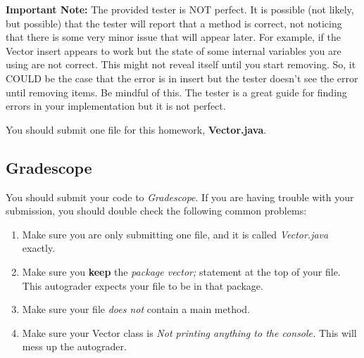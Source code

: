 \documentclass[paper=a4, fontsize=11pt, parskip=full]{scrartcl} %
\numberwithin{equation}{section} %
\numberwithin{figure}{section} %
\numberwithin{table}{section} %
\begin{document}
\textbf{Important Note: } The provided tester is NOT perfect. It is possible (not likely, but possible) that the tester will report that a method is correct, not noticing that there is some very minor issue that will appear later. For example, if the Vector insert appears to work but the state of some internal variables you are using are not correct. This might not reveal itself until you start removing. So, it COULD be the case that the error is in insert but the tester doesn't see the error until removing items. Be mindful of this. The tester is a great guide for finding errors in your implementation but it is not perfect.



You should submit one file for this homework, \textbf{Vector.java}.

\subsection{Gradescope}

You should submit your code to \emph{Gradescope}. If you are having trouble with your submission, you should double check the following common problems:

\begin{enumerate}
	\item Make sure you are only submitting one file, and it is called \emph{Vector.java} exactly.
	\item Make sure you \textbf{keep} the \emph{package vector;} statement at the top of your file. This autograder expects your file to be in that package.
	\item Make sure your file \emph{does not} contain a main method.
	\item Make sure your Vector class is \emph{Not printing anything to the console.} This will mess up the autograder.
\end{enumerate}

\end{document}
